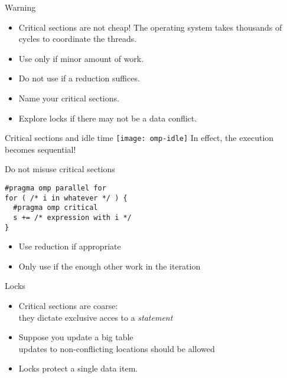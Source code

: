 \begin{numberedframe}{Warning}
  \begin{itemize}
  \item Critical sections are not cheap! The operating system takes
    thousands of cycles to coordinate the threads.
  \item Use only if minor amount of work.
  \item Do not use if a reduction suffices.
  \item Name your critical sections.
  \item Explore locks if there may not be a data conflict.
  \end{itemize}
\end{numberedframe}

\begin{numberedframe}{Critical sections and idle time}
    \texttt{[image: omp-idle]}
    In effect, the execution becomes sequential!
\end{numberedframe}

\begin{numberedframe}{Do not misuse critical sections}
\begin{lstlisting}
#pragma omp parallel for
for ( /* i in whatever */ ) {
  #pragma omp critical
  s += /* expression with i */
}
\end{lstlisting}
  \begin{itemize}
  \item Use reduction if appropriate
  \item Only use if the enough other work in the iteration
  \end{itemize}
\end{numberedframe}

\begin{numberedframe}{Locks}
  \begin{itemize}
  \item Critical sections are coarse:\\
    they dictate exclusive acces to a \emph{statement}
  \item     Suppose you update a big table\\
    updates to non-conflicting locations should be allowed
  \item Locks protect a single data item.
  \end{itemize}
\end{numberedframe}

\endinput

\begin{numberedframe}{}
  \begin{itemize}
  \item 
  \end{itemize}
\end{numberedframe}

